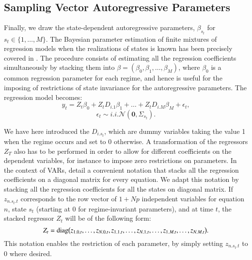 \documentclass[final,3p,authoryear]{elsarticle}
\begin{document}
\subsection{Sampling Vector Autoregressive Parameters}\label{ssec:var}


\noindent
Finally, we draw the state-dependent autoregressive parameters, $\beta_{s_t}$ for $s_t\in\{ 1,\dots,M\}$. The Bayesian parameter estimation of finite mixtures of regression models when the realizations of states is known has been precisely covered in \citet[Section 8.4.3]{Fruhwirth-Schnatter2006}. The procedure consists of estimating all the regression coefficients simultaneously by stacking them into $\beta = ( \beta_0, \beta_1, \dots, \beta_M) $, where $\beta_0$ is a common regression parameter for each regime, and hence is useful for the imposing of restrictions of state invariance for the autoregressive parameters. The regression model becomes:
\begin{equation}
  y_t = Z_t \beta_0 + Z_t D_{i.1} \beta_1 + \dots + Z_t D_{i.M} \beta_M  + \epsilon_t ,
\end{equation}
\begin{equation} 
\epsilon_t \sim i.i.\mathcal{N}(\mathbf{0}, \Sigma_{s_t}) .
\end{equation} 

We have here introduced the $D_{i.s_t}$, which are dummy variables taking the value 1 when the regime occurs and set to 0 otherwise. A transformation of the regressors $Z_T$ also has to be performed in order to allow for different coefficients on the dependent variables, for instance to impose zero restrictions on parameters. In the context of VARs, \citet[Section 2.2.3]{koop2010bayesian} detail a convenient notation that stacks all the regression coefficients on a diagonal matrix for every equation. We adapt this notation by stacking all the regression coefficients for all the states on diagonal matrix. If $z_{n.s_t.t}$ corresponds to the row vector of $1+Np$ independent variables for equation $n$, state $s_t$ (starting at 0 for regime-invariant parameters), and at time $t$, the stacked regressor $Z_t$ will be of the following form:
\begin{equation}   
  \setcounter{MaxMatrixCols}{11}       
  Z_t = \text{diag}\bigl( z_{1.0.t}, \dots , z_{N.0.t}, z_{1.1.t}, \dots , z_{N.1.t},\dots , z_{1.M.t}, \dots , z_{N.M.t} \bigr) .
    \nonumber
\end{equation}  
This notation enables the restriction of each parameter, by simply setting $z_{n.s_t.t}$ to 0 where desired.
\end{document}
